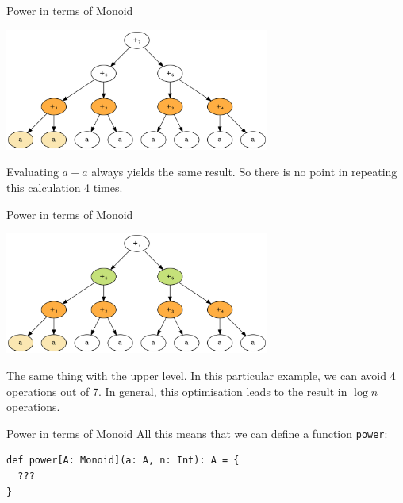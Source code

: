 \documentclass[presentation,aspectratio=169,smaller]{beamer}
\begin{document}
\begin{frame}[label={sec:org4cab848}]{Power in terms of Monoid}
\begin{center}
\includegraphics[height=4cm]{.dot/fold-power-2.png}
\end{center}

Evaluating \(a + a\) always yields the same result. So there is no point in
repeating this calculation 4 times.
\end{frame}

\begin{frame}[label={sec:org1626ec3}]{Power in terms of Monoid}
\begin{center}
\includegraphics[height=4cm]{.dot/fold-power-3.png}
\end{center}

The same thing with the upper level. In this particular example, we can avoid 4
operations out of 7. In general, this optimisation leads to the result in \(\log
n\) operations.
\end{frame}

\begin{frame}[label={sec:org91077cd},fragile]{Power in terms of Monoid}
 All this means that we can define a function \texttt{power}:

\begin{verbatim}
def power[A: Monoid](a: A, n: Int): A = {
  ???
}
\end{verbatim}
\end{frame}
\end{document}
